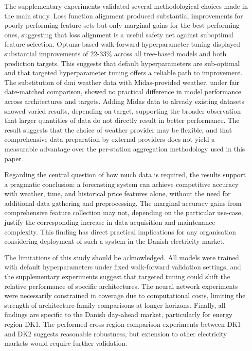 The supplementary experiments validated several methodological choices made in 
the main study. Loss function
alignment produced substantial improvements for poorly-performing feature sets 
but only marginal gains for the best-performing ones, suggesting that loss 
alignment is a useful
safety net against suboptimal feature selection. Optuna-based
walk-forward hyperparameter tuning displayed substantial improvements of 
22-33\% across all tree-based models and both
prediction targets. This suggests that default hyperparameters
are sub-optimal and that targeted hyperparameter tuning offers a
reliable path to improvement. The substitution of \gls{dmi} weather
data with Midas-provided weather, under fair date-matched
comparison, showed no practical difference in model performance across 
architectures and targets. Adding Midas data to
already existing datasets showed varied results, depending on
target, supporting the broader observation that larger quantities
of data do not directly result in better performance. The result
suggests that the choice of weather provider may be flexible,
and that comprehensive data preparation by external providers
does not yield a measurable advantage over the per-station
aggregation methodology used in this paper.

Regarding the central question of how much data is required,
the results support a pragmatic conclusion: a forecasting system
can achieve competitive accuracy with weather, time, and
historical price features alone, without the need for additional
data gathering and preprocessing. The marginal accuracy gains
from comprehensive feature collection may not, depending on
the particular use-case, justify the corresponding increase in
data acquisition and maintenance complexity. This finding has
direct practical implications for any organisation considering
deployment of such a system in the Danish electricity market.

The limitations of this study should be acknowledged.
All models were trained with default hyperparameters under
fixed walk-forward validation settings, and the supplementary
experiments suggest that targeted tuning could shift the relative
performance of specific architectures. The neural network
experiments were necessarily constrained in coverage due to
computational costs, limiting the strength of architecture-family
comparisons at longer horizons. Finally, all findings are specific
to the Danish day-ahead market, particularly for energy region
DK1. The performed cross-region comparison experiments
between DK1 and DK2 suggests reasonable robustness, but
extension to other electricity markets would require further
validation.

